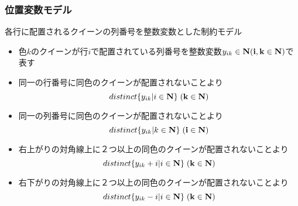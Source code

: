 \documentclass [dvipdfmx,11pt]{beamer}
\begin{document}
\begin{frame}
    \frametitle{位置変数モデル}
    
    {\small
        各行に配置される\alert{クイーンの列番号}を整数変数とした制約モデル
    }
    {\footnotesize
        \setlength{\abovedisplayskip}{1pt} %
        \setlength{\belowdisplayskip}{0pt} %
        \begin{block}{}
            \setlength{\itemsep}{0pt}
            \setlength{\parskip}{0pt}
            \begin{itemize}
                \item 色$k$のクイーンが行$i$で配置されている列番号を整数変数$y_{ik} \in \bf N (i, k \in \bf N)$で表す
                \item 同一の\alert{行番号}に同色のクイーンが配置されないことより
                    $$distinct\{y_{ik} | i \in \bf N\} \; (k \in \bf N)$$
                \item 同一の\alert{列番号}に同色のクイーンが配置されないことより
                    $$distinct\{y_{ik} | k \in \bf N\} \; (i \in \bf N)$$
                \item \alert{右上がりの対角線上}に２つ以上の同色のクイーンが配置されないことより
                    $$distinct\{y_{ik}+i | i \in \bf N\} \; (k \in \bf N)$$
                \item \alert{右下がりの対角線上}に２つ以上の同色のクイーンが配置されないことより
                    $$distinct\{y_{ik}-i | i \in \bf N\} \; (k \in \bf N)$$
            \end{itemize}
        \end{block}
    }
\end{frame}
\end{document}
